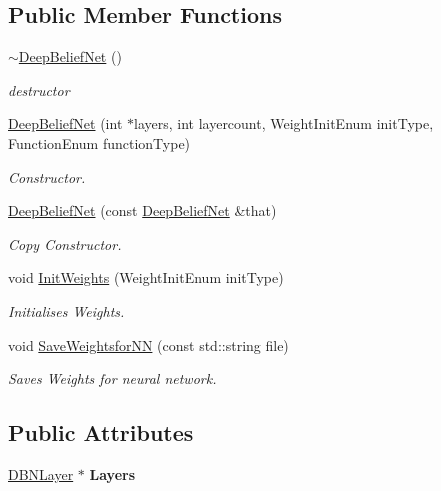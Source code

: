 \subsection*{Public Member Functions}
\begin{DoxyCompactItemize}
\item 
\hyperlink{class_n_n_t_lib_1_1_deep_belief_net_acaac4b567554fcbcfb2690d9cb2e1efb}{$\sim$\+Deep\+Belief\+Net} ()
\begin{DoxyCompactList}\small\item\em destructor \end{DoxyCompactList}\item 
\hyperlink{class_n_n_t_lib_1_1_deep_belief_net_a73dd53469742f45e085b2da799931b2c}{Deep\+Belief\+Net} (int $\ast$layers, int layercount, Weight\+Init\+Enum init\+Type, Function\+Enum function\+Type)
\begin{DoxyCompactList}\small\item\em Constructor. \end{DoxyCompactList}\item 
\hyperlink{class_n_n_t_lib_1_1_deep_belief_net_a4b15eba4fe97f8ef08478e3899fd72e6}{Deep\+Belief\+Net} (const \hyperlink{class_n_n_t_lib_1_1_deep_belief_net}{Deep\+Belief\+Net} \&that)
\begin{DoxyCompactList}\small\item\em Copy Constructor. \end{DoxyCompactList}\item 
void \hyperlink{class_n_n_t_lib_1_1_deep_belief_net_ab113a29355cce8baeb02db2f24b82396}{Init\+Weights} (Weight\+Init\+Enum init\+Type)
\begin{DoxyCompactList}\small\item\em Initialises Weights. \end{DoxyCompactList}\item 
void \hyperlink{class_n_n_t_lib_1_1_deep_belief_net_a665aa122bef611a89fd6aaaf818dbca1}{Save\+Weightsfor\+N\+N} (const std\+::string file)
\begin{DoxyCompactList}\small\item\em Saves Weights for neural network. \end{DoxyCompactList}\end{DoxyCompactItemize}
\subsection*{Public Attributes}
\begin{DoxyCompactItemize}
\item 
\hypertarget{class_n_n_t_lib_1_1_deep_belief_net_a21888da16f416fe46f75945b84d5ecba}{}\hyperlink{class_n_n_t_lib_1_1_d_b_n_layer}{D\+B\+N\+Layer} $\ast$ {\bfseries Layers}\label{class_n_n_t_lib_1_1_deep_belief_net_a21888da16f416fe46f75945b84d5ecba}

\end{DoxyCompactItemize}

